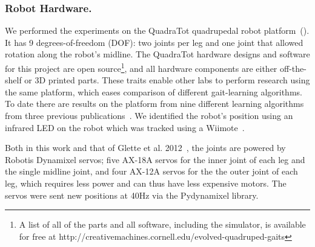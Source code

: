 \subsubsection{Robot Hardware.}

We performed the experiments on the QuadraTot quadrupedal robot platform~().
It has 9 degrees-of-freedom (DOF): two joints per leg and one joint that allowed rotation along the robot's midline. %
The QuadraTot hardware designs and software for this project are open source\footnote{A list of all of the parts and all software, including the simulator, is available for free at http://creativemachines.cornell.edu/evolved-quadruped-gaits}, and all hardware components are either off-the-shelf or 3D printed parts. These traits enable other labs to perform research using the same platform, which eases comparison of different gait-learning algorithms. 
To date there are results on the platform from nine different learning algorithms from three previous publications~\cite{yos:clune,glette,haocheng}. We identified the robot's position using an infrared LED on the robot which was tracked using a Wiimote~\cite{yos:clune}.

Both in this work and that of Glette et al. 2012~\cite{glette}, the joints are powered by Robotis Dynamixel servos; five AX-18A servos for the inner joint of each leg and the single midline joint, and four AX-12A servos for the the outer joint of each leg, which requires less power and can thus have less expensive motors. The servos were sent new positions at 40Hz via the Pydynamixel library. 

